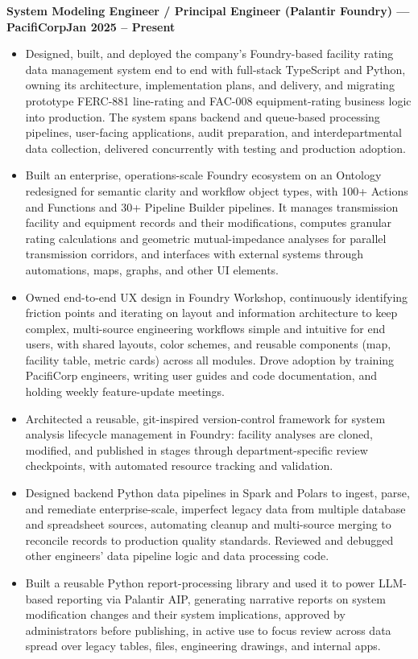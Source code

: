 \documentclass[10pt, letterpaper]{article}
\newcommand{\jobline}[2]{%
  \vspace{5pt}%
  \noindent\textbf{#1}\hfill\textbf{#2}\par%
  \vspace{1pt}%
}
\newenvironment{rlist}{%
  \begin{itemize}[leftmargin=1.4em, itemsep=1pt, topsep=2pt, parsep=0pt]%
}{%
  \end{itemize}%
}
\begin{document}
\jobline{System Modeling Engineer / Principal Engineer (Palantir Foundry) --- PacifiCorp}{Jan 2025 -- Present}
\begin{rlist}
  \item Designed, built, and deployed the company's Foundry-based facility rating data management system end to end with full-stack TypeScript and Python, owning its architecture, implementation plans, and delivery, and migrating prototype FERC-881 line-rating and FAC-008 equipment-rating business logic into production. The system spans backend and queue-based processing pipelines, user-facing applications, audit preparation, and interdepartmental data collection, delivered concurrently with testing and production adoption.
  \item Built an enterprise, operations-scale Foundry ecosystem on an Ontology redesigned for semantic clarity and workflow object types, with 100+ Actions and Functions and 30+ Pipeline Builder pipelines. It manages transmission facility and equipment records and their modifications, computes granular rating calculations and geometric mutual-impedance analyses for parallel transmission corridors, and interfaces with external systems through automations, maps, graphs, and other UI elements.
  \item Owned end-to-end UX design in Foundry Workshop, continuously identifying friction points and iterating on layout and information architecture to keep complex, multi-source engineering workflows simple and intuitive for end users, with shared layouts, color schemes, and reusable components (map, facility table, metric cards) across all modules. Drove adoption by training PacifiCorp engineers, writing user guides and code documentation, and holding weekly feature-update meetings.
  \item Architected a reusable, git-inspired version-control framework for system analysis lifecycle management in Foundry: facility analyses are cloned, modified, and published in stages through department-specific review checkpoints, with automated resource tracking and validation.
  \item Designed backend Python data pipelines in Spark and Polars to ingest, parse, and remediate enterprise-scale, imperfect legacy data from multiple database and spreadsheet sources, automating cleanup and multi-source merging to reconcile records to production quality standards. Reviewed and debugged other engineers' data pipeline logic and data processing code.
  \item Built a reusable Python report-processing library and used it to power LLM-based reporting via Palantir AIP, generating narrative reports on system modification changes and their system implications, approved by administrators before publishing, in active use to focus review across data spread over legacy tables, files, engineering drawings, and internal apps.

\end{rlist}
\end{document}
